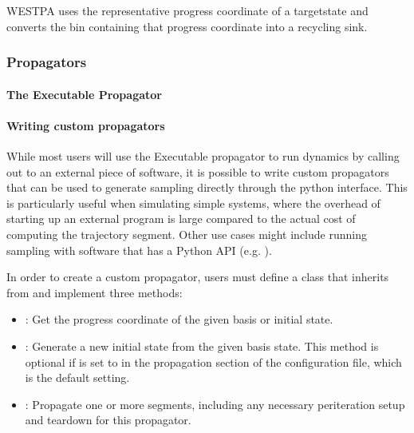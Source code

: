 \documentclass[letterpaper,10pt,english]{sphinxmanual}
\begin{document}
WESTPA uses the representative progress coordinate of a target\sphinxhyphen{}state and
converts the  bin containing that progress coordinate into a
recycling sink.


\subsubsection{Propagators}
\label{\detokenize{users_guide/west/setup:propagators}}

\paragraph{The Executable Propagator}
\label{\detokenize{users_guide/west/setup:the-executable-propagator}}

\paragraph{Writing custom propagators}
\label{\detokenize{users_guide/west/setup:writing-custom-propagators}}
While most users will use the Executable propagator to run dynamics by calling
out to an external piece of software, it is possible to write custom
propagators that can be used to generate sampling directly through the python
interface. This is particularly useful when simulating simple systems, where
the overhead of starting up an external program is large compared to the actual
cost of computing the trajectory segment. Other use cases might include running
sampling with software that has a Python API (e.g. ).

In order to create a custom propagator, users must define a class that inherits
from  and implement three methods:
\begin{itemize}
\item {} 
: Get the progress coordinate of the given basis
or initial state.

\item {} 
: Generate a new initial
state from the given basis state. This method is optional if 
is set to  in the propagation section of the configuration file,
which is the default setting.

\item {} 
: Propagate one or more segments, including any
necessary per\sphinxhyphen{}iteration setup and teardown for this propagator.

\end{itemize}
\end{document}
